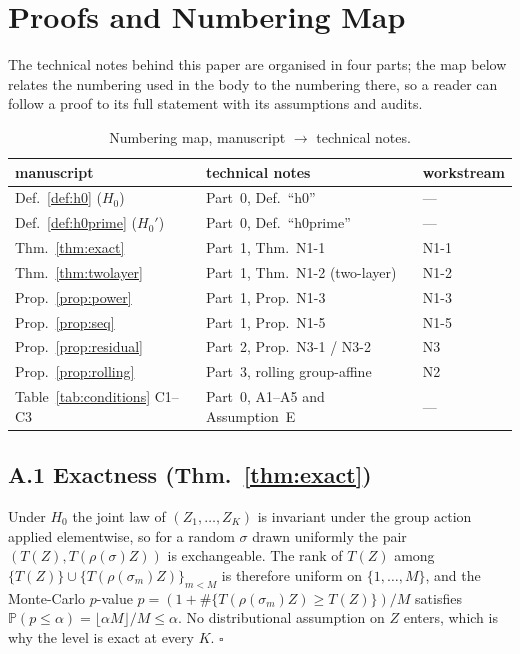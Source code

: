 \section{Proofs and Numbering Map}
\label{app:proofs}

The technical notes behind this paper are organised in four parts; the map below relates the numbering used in the body
to the numbering there, so a reader can follow a proof to its full statement with its assumptions and audits.

\begin{table}[h]
\centering
\footnotesize
\caption{Numbering map, manuscript $\rightarrow$ technical notes.}
\label{tab:map}
\begin{tabular}{@{}lll@{}}
\toprule
manuscript & technical notes & workstream \\
\midrule
Def.~\ref{def:h0} ($H_0$) & Part~0, Def.~``h0'' & --- \\
Def.~\ref{def:h0prime} ($H_0'$) & Part~0, Def.~``h0prime'' & --- \\
Thm.~\ref{thm:exact} & Part~1, Thm.~N1-1 & N1-1 \\
Thm.~\ref{thm:twolayer} & Part~1, Thm.~N1-2 (two-layer) & N1-2 \\
Prop.~\ref{prop:power} & Part~1, Prop.~N1-3 & N1-3 \\
Prop.~\ref{prop:seq} & Part~1, Prop.~N1-5 & N1-5 \\
Prop.~\ref{prop:residual} & Part~2, Prop.~N3-1 / N3-2 & N3 \\
Prop.~\ref{prop:rolling} & Part~3, rolling group-affine & N2 \\
Table~\ref{tab:conditions} C1--C3 & Part~0, A1--A5 and Assumption~E & --- \\
\bottomrule
\end{tabular}
\end{table}

\subsection*{A.1 Exactness (Thm.~\ref{thm:exact})}
Under $H_0$ the joint law of $(Z_1,\dots,Z_K)$ is invariant under the group action applied elementwise, so for a random
$\sigma$ drawn uniformly the pair $(T(Z), T(\rho(\sigma)Z))$ is exchangeable. The rank of $T(Z)$ among
$\{T(Z)\}\cup\{T(\rho(\sigma_m)Z)\}_{m<M}$ is therefore uniform on $\{1,\dots,M\}$, and the Monte-Carlo $p$-value
$p=(1+\#\{T(\rho(\sigma_m)Z)\ge T(Z)\})/M$ satisfies $\mathbb{P}(p\le\alpha)=\lfloor\alpha M\rfloor/M\le\alpha$. No
distributional assumption on $Z$ enters, which is why the level is exact at every $K$. \hfill$\square$


